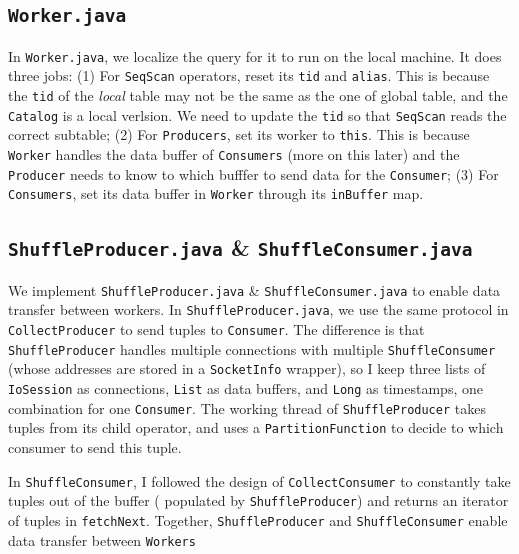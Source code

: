\documentclass[12pt]{myland}
\def\<#1>{\texttt{#1}}
\begin{document}
    \subsection{\<Worker.java>}
    In \<Worker.java>, we localize the query for it to run on the local machine. It does three jobs: (1) For \<SeqScan>
    operators, reset its \<tid> and \<alias>. This is because the \<tid> of the \emph{local} table may not be the
    same as the one of global table, and the \<Catalog> is a local verlsion. We need to update the \<tid> so that
    \<SeqScan> reads the correct subtable; (2) For \<Producers>, set its worker to \<this>. This is because \<Worker>
    handles the data buffer of \<Consumers> (more on this later) and the \<Producer> needs to know to which bufffer to
    send data for the \<Consumer>; (3) For \<Consumers>, set its data buffer in \<Worker> through its
    \<inBuffer> map.

    \subsection{\<ShuffleProducer.java> \& \<ShuffleConsumer.java>}
    We implement \<ShuffleProducer.java> \& \<ShuffleConsumer.java> to enable data transfer between workers. In
    \<ShuffleProducer.java>, we use the same protocol in \<CollectProducer> to send tuples to \<Consumer>. The difference
    is that \<ShuffleProducer> handles multiple connections with multiple \<ShuffleConsumer> (whose addresses
    are stored in a \<SocketInfo> wrapper), so I keep three lists of \<IoSession> as connections, \<List> as data buffers,
    and \<Long> as timestamps, one combination for one \<Consumer>. The working thread of \<ShuffleProducer> takes
    tuples from its child operator, and uses a \<PartitionFunction> to decide to which consumer to send this tuple. \par

    In \<ShuffleConsumer>, I followed the design of \<CollectConsumer> to constantly take tuples out of the buffer (
    populated by \<ShuffleProducer>) and returns an iterator of tuples in \<fetchNext>. Together, \<ShuffleProducer>
    and \<ShuffleConsumer> enable data transfer between \<Workers>
\end{document}

